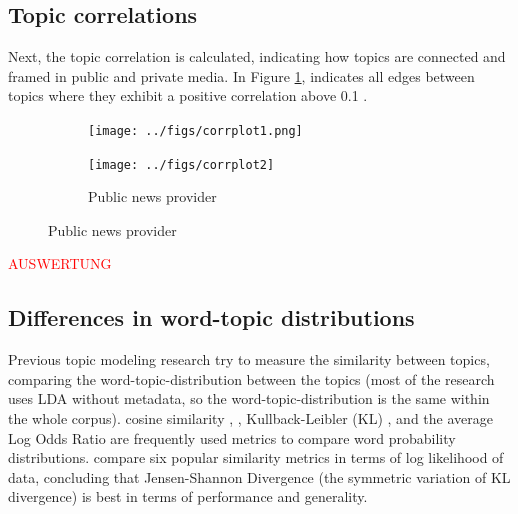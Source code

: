 \documentclass[12pt,a4paper,notitlepage]{article}
\begin{document}
{\subsection{Topic correlations}\label{subsection_topiccorrelation}

Next, the topic correlation is calculated, indicating how topics are connected and framed in public and private media. In Figure \ref{fig_topic_correlations}, indicates all edges between topics where they exhibit a positive correlation above 0.1 \citep{roberts_model_2016}.


\begin{figure}[H]
	\caption{Topic Correlation}
		\begin{center}
		\begin{subfigure}{.7\textwidth}
			\texttt{[image: ../figs/corrplot1.png]}	
		\end{subfigure}
		\begin{subfigure}{.7\textwidth}
			\texttt{[image: ../figs/corrplot2]}
			\caption{Public news provider}	
		\end{subfigure}
		\end{center}
	\label{fig_topic_correlations}
\end{figure}

\textcolor{red}{AUSWERTUNG}

\subsection{Differences in word-topic distributions}\label{subsection_similarity}

Previous topic modeling research try to measure the similarity between topics, comparing the word-topic-distribution between the topics (most of the research uses LDA without metadata, so the word-topic-distribution is the same within the whole corpus). cosine similarity \citep{he_detecting_2009}, \citep{ramage_labeled_2009}, Kullback-Leibler (KL) \citep{newman_distributed_2009}, \citep{wang_mining_2009} and the average Log Odds Ratio \citep{chaney_visualizing_2012} are frequently used metrics to compare word probability distributions. \citet{kim_topic_2011} compare six popular similarity metrics in terms of log likelihood of data, concluding that Jensen-Shannon Divergence (the symmetric variation of KL divergence) is best in terms of performance and generality. 

}
\end{document}
